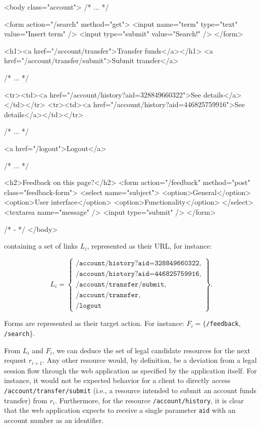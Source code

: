 \begin{html}
<body class="account">
  /* ... */

  <form action="/search" method="get">
    <input name="term" type="text" value="Insert term" />
    <input type="submit" value="Search!" />
  </form>  

  <h1><a href="/account/transfer">Transfer funds</a></h1>
  <a href="/account/transfer/submit">Submit transfer</a>

  /* ... */

  <tr><td><a href="/account/history?aid=328849660322">See details</a></td></tr>
  <tr><td><a href="/account/history?aid=446825759916">See details</a></td></tr>

  /* ... */

  <a href="/logout">Logout</a>

  /* ... */

  <h2>Feedback on this page?</h2>
  <form action="/feedback" method="post" class="feedback-form">
    <select name="subject">
      <option>General</option>
      <option>User interface</option>
      <option>Functionality</option>
    </select>
    <textarea name="message" />
    <input type="submit" />
  </form>

  /* - */
</body>
\end{html}

\noindent containing a set of links $L_{i}$, represented as their \ac{URL}, for instance:

\begin{displaymath}
  L_{i} =
  \left\{
    \begin{array}{l}
      \texttt{/account/history?aid=328849660322},\\
      \texttt{/account/history?aid=446825759916},\\
      \texttt{/account/transfer/submit},\\
      \texttt{/account/transfer},\\
      \texttt{/logout}
    \end{array}
  \right\}.
\end{displaymath}

\noindent Forms are represented as their target action. For instance: $F_{i} =\{$\texttt{/feedback}, \texttt{/search}$\}$.

From $L_i$ and $F_i$, we can deduce the set of legal candidate resources for the next request $r_{i+1}$.  Any other resource would, by definition, be a deviation from a legal session flow through the web application as specified by the application itself.  For instance, it would not be expected behavior for a client to directly access \texttt{/account/transfer/submit} (i.e., a resource intended to submit an account funds transfer) from $r_i$.  Furthermore, for the resource \texttt{/account/history}, it is clear that the web application expects to receive a single parameter \texttt{aid} with an account number as an identifier.

